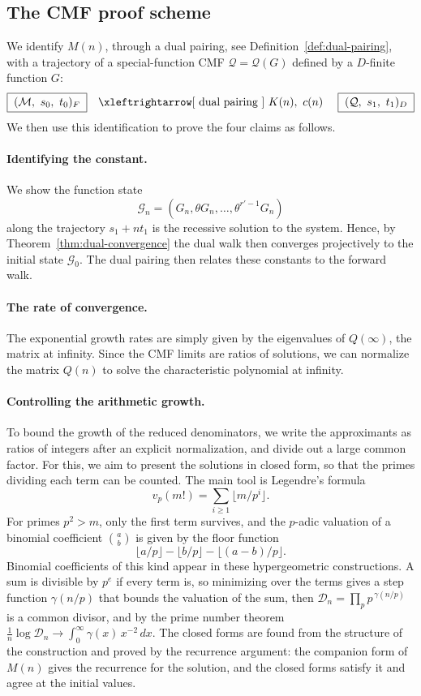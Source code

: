 \subsection{The CMF proof scheme}
\label{cmf proof stratergy}
We identify $M(n)$, through a dual pairing, see Definition~\ref{def:dual-pairing}, with a trajectory of a
special-function CMF $\mathcal Q=\mathcal Q(G)$ defined by a $D$-finite
function $G$:
\[
  \boxed{\;(\mathcal M,\ s_0,\ t_0)_F\;}
  \quad\xleftrightarrow[\ \text{dual pairing}\ ]{\ K(n),\ c(n)\ }\quad
  \boxed{\;(\mathcal Q,\ s_1,\ t_1)_D\;}
\]
We then use this identification to prove the four claims as follows.

\paragraph{Identifying the constant.}
\label{par: constant}
We show the function state 
\[\mathcal G_n=(G_n,\theta G_n,\dots,\theta^{r'-1}G_n)\]
along the trajectory $s_1+nt_1$ is the recessive solution to the system. 
Hence, by Theorem~\ref{thm:dual-convergence} the dual walk then converges projectively to the initial state $\mathcal G_0$. The dual pairing then relates these constants to the forward walk.

\paragraph{The rate of convergence.}
The exponential growth rates are simply given by the eigenvalues of $Q(\infty)$, the matrix at infinity. Since the CMF limits are ratios of solutions, we can normalize the matrix $Q(n)$ to solve the characteristic polynomial at infinity.

\paragraph{Controlling the arithmetic growth.}\label{par: arithmetic control}
To bound the growth of the reduced denominators, we write the approximants as ratios of integers after an explicit normalization, and divide out a large common factor. For this, we aim to present the solutions in closed form, so that the primes dividing each term can be counted. The main tool is Legendre's formula
\[
v_p(m!)=\sum_{i\ge1}\lfloor m/p^i\rfloor.
\]
For primes $p^2>m$, only the first term survives, and the $p$-adic valuation of a binomial coefficient $\binom ab$ is given by the floor function 
\[
\lfloor a/p\rfloor-\lfloor b/p\rfloor-\lfloor(a-b)/p\rfloor.
\] 
Binomial coefficients of this kind appear in these hypergeometric constructions. 
A sum is divisible by $p^e$ if every term is, so minimizing over the terms gives a step function $\gamma(n/p)$ that bounds the valuation of the sum, then $\mathcal D_n=\prod_pp^{\,\gamma(n/p)}$ is a common divisor, and by the prime number theorem $\frac1n\log\mathcal D_n\to\int_0^\infty\gamma(x)\,x^{-2}\,dx$.
The closed forms are found from the structure of the construction and proved by the recurrence argument: the companion form of $M(n)$ gives the recurrence for the solution, and the closed forms satisfy it and agree at the initial values.

